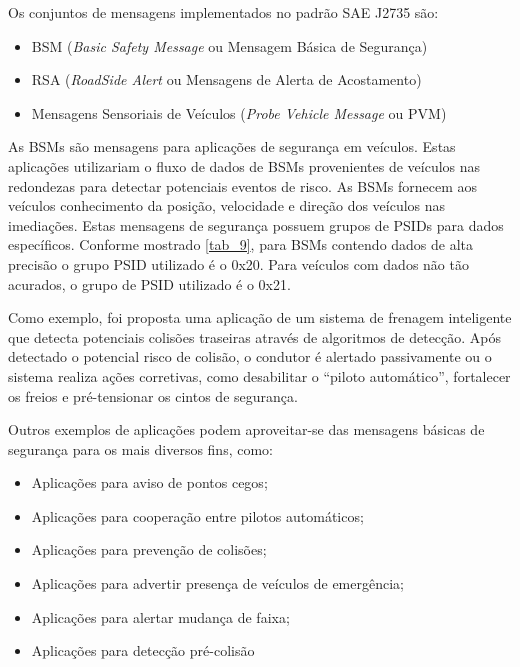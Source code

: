 \documentclass[
12pt,				%
openright,			%
oneside,			%
a4paper,			%
brazil,				%
]{abntex2}
\begin{document}
	\par Os conjuntos de mensagens implementados no padrão SAE J2735 são:

	\begin{itemize}
		\item BSM (\textit{Basic Safety Message} ou Mensagem Básica de Segurança)
		\item RSA (\textit{RoadSide Alert} ou Mensagens de Alerta de Acostamento)
		\item Mensagens Sensoriais de Veículos (\textit{Probe Vehicle Message} ou PVM)
	\end{itemize}
	
	\par As BSMs são mensagens para aplicações de segurança em veículos. Estas aplicações utilizariam o fluxo de dados de BSMs provenientes de veículos nas redondezas para detectar potenciais eventos de risco. As BSMs fornecem aos veículos conhecimento da posição, velocidade e direção dos veículos nas imediações. Estas mensagens de segurança possuem grupos de PSIDs para dados específicos. Conforme mostrado \autoref{tab_9}, para BSMs contendo dados de alta precisão o grupo PSID utilizado é o 0x20. Para veículos com dados não tão acurados, o grupo de PSID utilizado é o 0x21. 
	
	\par Como exemplo, foi proposta uma aplicação de um sistema de frenagem inteligente que detecta potenciais colisões traseiras através de algoritmos de detecção. Após detectado o potencial risco de colisão, o condutor é alertado passivamente ou o sistema realiza ações corretivas, como desabilitar o “piloto automático”, fortalecer os freios e pré-tensionar os cintos de segurança. 
	
	\par Outros exemplos de aplicações podem aproveitar-se das mensagens básicas de segurança para os mais diversos fins, como:
	\begin{itemize}
		\item Aplicações para aviso de pontos cegos;
		\item Aplicações para cooperação entre pilotos automáticos;
		\item Aplicações para prevenção de colisões;
		\item Aplicações para advertir presença de veículos de emergência;
		\item Aplicações para alertar mudança de faixa;
		\item Aplicações para detecção pré-colisão
	\end{itemize}
	
\end{document}
